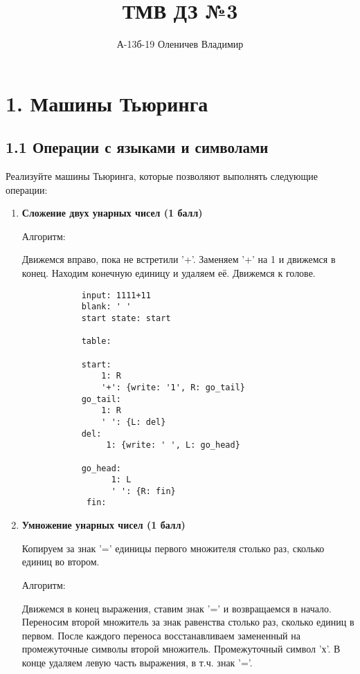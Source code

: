 \documentclass{article}
\title{ТМВ ДЗ №3}
\author{А-13б-19 Оленичев Владимир}
\date{}
\begin{document}
\maketitle





\section*{1. Машины Тьюринга}

\subsection*{1.1 Операции с языками и символами}

Реализуйте машины Тьюринга, которые позволяют выполнять следующие операции:
\begin{enumerate}

    
    \item \textbf{Сложение двух унарных чисел (1 балл)}
    
        Алгоритм:
        \begin{enumerate}
            Движемся вправо, пока не встретили '+'.
            Заменяем '+' на 1 и движемся в конец.
            Находим конечную единицу и удаляем её.
            Движемся к голове.
        \end{enumerate}
        
        
        \begin{verbatim}
            input: 1111+11 
            blank: ' '
            start state: start

            table:
    
            start:  
                1: R
                '+': {write: '1', R: go_tail}
            go_tail:
                1: R
                ' ': {L: del}
            del:
                 1: {write: ' ', L: go_head}
          
            go_head:
                  1: L
                  ' ': {R: fin}
             fin:
        \end{verbatim}
        



    \item \textbf{Умножение унарных чисел (1 балл)}
    
        Копируем за знак '=' единицы первого множителя столько раз, сколько единиц во втором.
        
        Алгоритм:
        \begin{enumerate}
           Движемся в конец выражения, ставим знак '=' и возвращаемся в начало. Переносим второй множитель за знак равенства столько раз, сколько единиц в первом. После каждого переноса восстанавливаем замененный на промежуточные символы второй множитель. Промежуточный символ 'х'. В конце удаляем левую часть выражения, в т.ч. знак '='.
           

\end{enumerate}
\end{enumerate}
\end{document}

